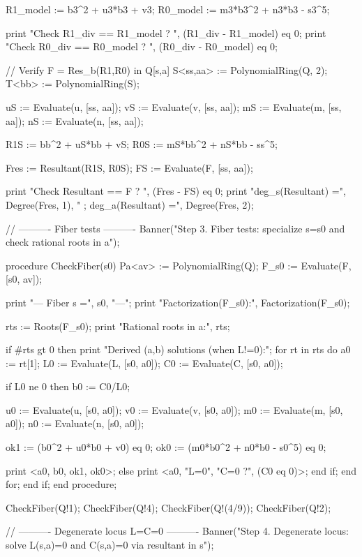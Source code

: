 \documentclass[12pt]{article}
\theoremstyle{remark}
\theoremstyle{definition}
\begin{document}
\begin{code}
R1_model := b3^2 + u3*b3 + v3;
R0_model := m3*b3^2 + n3*b3 - s3^5;

print "Check R1_div == R1_model ?  ", (R1_div - R1_model) eq 0;
print "Check R0_div == R0_model ?  ", (R0_div - R0_model) eq 0;

// Verify F = Res_b(R1,R0) in Q[s,a]
S<ss,aa> := PolynomialRing(Q, 2);
T<bb> := PolynomialRing(S);

uS := Evaluate(u, [ss, aa]);
vS := Evaluate(v, [ss, aa]);
mS := Evaluate(m, [ss, aa]);
nS := Evaluate(n, [ss, aa]);

R1S := bb^2 + uS*bb + vS;
R0S := mS*bb^2 + nS*bb - ss^5;

Fres := Resultant(R1S, R0S);
FS   := Evaluate(F, [ss, aa]);

print "Check Resultant == F ?      ", (Fres - FS) eq 0;
print "deg_s(Resultant) =", Degree(Fres, 1), " ; deg_a(Resultant) =", Degree(Fres, 2);

// ---------- Fiber tests ----------
Banner("Step 3. Fiber tests: specialize s=s0 and check rational roots in a");

procedure CheckFiber(s0)
    Pa<av> := PolynomialRing(Q);
    F_s0 := Evaluate(F, [s0, av]);

    print "\n--- Fiber s =", s0, "---";
    print "Factorization(F_s0):", Factorization(F_s0);

    rts := Roots(F_s0);
    print "Rational roots in a:", rts;

    if #rts gt 0 then
        print "Derived (a,b) solutions (when L!=0):";
        for rt in rts do
            a0 := rt[1];
            L0 := Evaluate(L, [s0, a0]);
            C0 := Evaluate(C, [s0, a0]);

            if L0 ne 0 then
                b0 := C0/L0;

                u0 := Evaluate(u, [s0, a0]);
                v0 := Evaluate(v, [s0, a0]);
                m0 := Evaluate(m, [s0, a0]);
                n0 := Evaluate(n, [s0, a0]);

                ok1 := (b0^2 + u0*b0 + v0) eq 0;
                ok0 := (m0*b0^2 + n0*b0 - s0^5) eq 0;

                print <a0, b0, ok1, ok0>;
            else
                print <a0, "L=0", "C=0 ?", (C0 eq 0)>;
            end if;
        end for;
    end if;
end procedure;

CheckFiber(Q!1);
CheckFiber(Q!4);
CheckFiber(Q!(4/9));
CheckFiber(Q!2);

// ---------- Degenerate locus L=C=0 ----------
Banner("Step 4. Degenerate locus: solve L(s,a)=0 and C(s,a)=0 via resultant in s");


\end{code}
\end{document}
